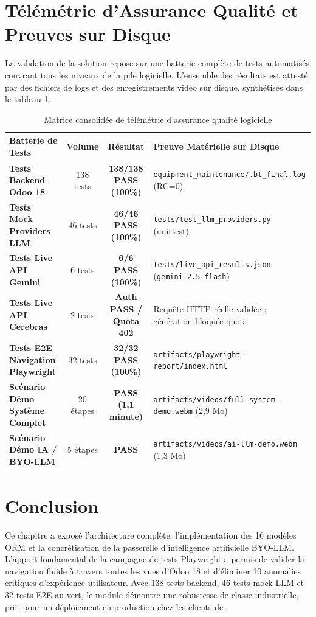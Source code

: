 \section{Télémétrie d'Assurance Qualité et Preuves sur Disque}
La validation de la solution repose sur une batterie complète de tests automatisés couvrant tous les niveaux de la pile logicielle. L'ensemble des résultats est attesté par des fichiers de logs et des enregistrements vidéo sur disque, synthétisés dans le tableau \ref{tab:qa_telemetry}.

\begin{table}[!ht]
\centering
\small
\renewcommand{\arraystretch}{1.2}
\begin{tabularx}{\textwidth}{l c c p{4.2cm}}
\toprule
\textbf{Batterie de Tests} & \textbf{Volume} & \textbf{Résultat} & \textbf{Preuve Matérielle sur Disque} \\
\midrule
\textbf{Tests Backend Odoo 18} & 138 tests & \textbf{138/138 PASS (100\%)} & \texttt{equipment\_maintenance/.bt\_final.log} (RC=0) \\
\textbf{Tests Mock Providers LLM} & 46 tests & \textbf{46/46 PASS (100\%)} & \texttt{tests/test\_llm\_providers.py} (unittest) \\
\textbf{Tests Live API Gemini} & 6 tests & \textbf{6/6 PASS (100\%)} & \texttt{tests/live\_api\_results.json} (\texttt{gemini-2.5-flash}) \\
\textbf{Tests Live API Cerebras} & 2 tests & \textbf{Auth PASS / Quota 402} & Requête HTTP réelle validée ; génération bloquée quota \\
\textbf{Tests E2E Navigation Playwright} & 32 tests & \textbf{32/32 PASS (100\%)} & \texttt{artifacts/playwright-report/index.html} \\
\textbf{Scénario Démo Système Complet} & 20 étapes & \textbf{PASS (1,1 minute)} & \texttt{artifacts/videos/full-system-demo.webm} (2,9 Mo) \\
\textbf{Scénario Démo IA / BYO-LLM} & 5 étapes & \textbf{PASS} & \texttt{artifacts/videos/ai-llm-demo.webm} (1,3 Mo) \\
\bottomrule
\end{tabularx}
\caption{Matrice consolidée de télémétrie d'assurance qualité logicielle}
\label{tab:qa_telemetry}
\end{table}

\section{Conclusion}
Ce chapitre a exposé l'architecture complète, l'implémentation des 16 modèles ORM et la concrétisation de la passerelle d'intelligence artificielle BYO-LLM. L'apport fondamental de la campagne de tests Playwright a permis de valider la navigation fluide à travers toutes les vues d'Odoo 18 et d'éliminer 10 anomalies critiques d'expérience utilisateur. Avec 138 tests backend, 46 tests mock LLM et 32 tests E2E au vert, le module \textbf{\odooModule} démontre une robustesse de classe industrielle, prêt pour un déploiement en production chez les clients de \textbf{\companyName}.
